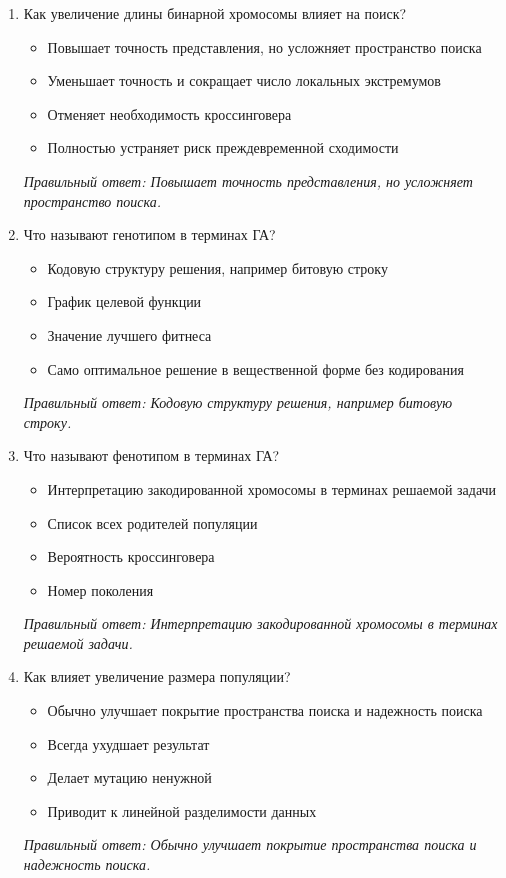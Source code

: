 \begin{enumerate}[label=\textbf{\arabic*.}, leftmargin=0pt, itemsep=1.2em]
\item Как увеличение длины бинарной хромосомы влияет на поиск?
\begin{itemize}[label=$\square$, leftmargin=1.5cm, itemsep=0.2em, topsep=0.3em]
\item Повышает точность представления, но усложняет пространство поиска
\item Уменьшает точность и сокращает число локальных экстремумов
\item Отменяет необходимость кроссинговера
\item Полностью устраняет риск преждевременной сходимости
\end{itemize}
{\small\textit{Правильный ответ: Повышает точность представления, но усложняет пространство поиска.}}

\item Что называют генотипом в терминах ГА?
\begin{itemize}[label=$\square$, leftmargin=1.5cm, itemsep=0.2em, topsep=0.3em]
\item Кодовую структуру решения, например битовую строку
\item График целевой функции
\item Значение лучшего фитнеса
\item Само оптимальное решение в вещественной форме без кодирования
\end{itemize}
{\small\textit{Правильный ответ: Кодовую структуру решения, например битовую строку.}}

\item Что называют фенотипом в терминах ГА?
\begin{itemize}[label=$\square$, leftmargin=1.5cm, itemsep=0.2em, topsep=0.3em]
\item Интерпретацию закодированной хромосомы в терминах решаемой задачи
\item Список всех родителей популяции
\item Вероятность кроссинговера
\item Номер поколения
\end{itemize}
{\small\textit{Правильный ответ: Интерпретацию закодированной хромосомы в терминах решаемой задачи.}}

\item Как влияет увеличение размера популяции?
\begin{itemize}[label=$\square$, leftmargin=1.5cm, itemsep=0.2em, topsep=0.3em]
\item Обычно улучшает покрытие пространства поиска и надежность поиска
\item Всегда ухудшает результат
\item Делает мутацию ненужной
\item Приводит к линейной разделимости данных
\end{itemize}
{\small\textit{Правильный ответ: Обычно улучшает покрытие пространства поиска и надежность поиска.}}


\end{enumerate}
